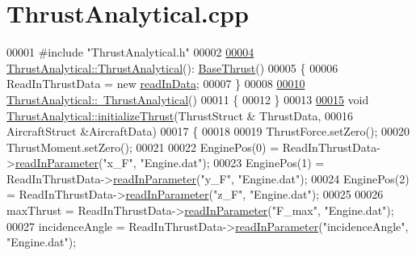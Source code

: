 \hypertarget{_thrust_analytical_8cpp_source}{}\section{Thrust\+Analytical.\+cpp}
\label{_thrust_analytical_8cpp_source}

\begin{DoxyCode}
00001 \textcolor{preprocessor}{#include "ThrustAnalytical.h"}
00002 
\hyperlink{group___engine_a5c75949a22871e861090560adb2d5f18}{00004} \hyperlink{group___engine_a5c75949a22871e861090560adb2d5f18}{ThrustAnalytical::ThrustAnalytical}():
      \hyperlink{group___engine_class_base_thrust}{BaseThrust}()
00005 \{
00006     ReadInThrustData = \textcolor{keyword}{new} \hyperlink{classread_in_data}{readInData};
00007 \}
00008 
\hyperlink{group___engine_aeaf9dd69c10812c673d6cfae0d7ca4fd}{00010} \hyperlink{group___engine_aeaf9dd69c10812c673d6cfae0d7ca4fd}{ThrustAnalytical::~ThrustAnalytical}()
00011 \{
00012 \}
00013 
\hyperlink{group___engine_a2bdad8d5195990b3bcb0139bc408f199}{00015} \textcolor{keywordtype}{void} \hyperlink{group___engine_a2bdad8d5195990b3bcb0139bc408f199}{ThrustAnalytical::initializeThrust}(ThrustStruct & ThrustData,
00016                                         AircraftStruct &AircraftData)
00017 \{
00018     
00019     ThrustForce.setZero();
00020     ThrustMoment.setZero();
00021 
00022     EnginePos(0) = ReadInThrustData->\hyperlink{classread_in_data_a9ae979e74958b43424cb6cf4a22043d7}{readInParameter}(\textcolor{stringliteral}{"x\_F"}, \textcolor{stringliteral}{"Engine.dat"});
00023     EnginePos(1) = ReadInThrustData->\hyperlink{classread_in_data_a9ae979e74958b43424cb6cf4a22043d7}{readInParameter}(\textcolor{stringliteral}{"y\_F"}, \textcolor{stringliteral}{"Engine.dat"});
00024     EnginePos(2) = ReadInThrustData->\hyperlink{classread_in_data_a9ae979e74958b43424cb6cf4a22043d7}{readInParameter}(\textcolor{stringliteral}{"z\_F"}, \textcolor{stringliteral}{"Engine.dat"});
00025 
00026     maxThrust = ReadInThrustData->\hyperlink{classread_in_data_a9ae979e74958b43424cb6cf4a22043d7}{readInParameter}(\textcolor{stringliteral}{"F\_max"}, \textcolor{stringliteral}{"Engine.dat"});
00027     incidenceAngle = ReadInThrustData->\hyperlink{classread_in_data_a9ae979e74958b43424cb6cf4a22043d7}{readInParameter}(\textcolor{stringliteral}{"incidenceAngle"}, \textcolor{stringliteral}{"Engine.dat"});

\end{DoxyCode}
